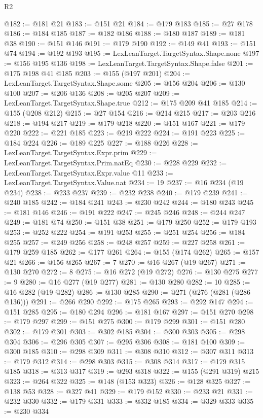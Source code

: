 \begin{lexlean}{R2}
\begin{coremodule}
@182 := @181 @21
@183 := @151 @21
@184 := @179 @183
@185 := @27 @178
@186 := @184 @185
@187 := @182 @186
@188 := @180 @187
@189 := @181 @38
@190 := @151 @146
@191 := @179 @190
@192 := @149 @41
@193 := @151 @74
@194 := @192 @193
@195 := LexLeanTarget.TargetSyntax.Shape.none
@197 := @156 @195 @136
@198 := LexLeanTarget.TargetSyntax.Shape.false
@201 := @175 @198 @41 @185
@203 := @155 (@197 @201)
@204 := LexLeanTarget.TargetSyntax.Shape.some
@205 := @156 @204
@206 := @130 @100
@207 := @206 @136
@208 := @205 @207
@209 := LexLeanTarget.TargetSyntax.Shape.true
@212 := @175 @209 @41 @185
@214 := @155 (@208 @212)
@215 := @27 @154
@216 := @214 @215
@217 := @203 @216
@218 := @194 @217
@219 := @179 @218
@220 := @151 @167
@221 := @179 @220
@222 := @221 @185
@223 := @219 @222
@224 := @191 @223
@225 := @184 @224
@226 := @189 @225
@227 := @188 @226
@228 := LexLeanTarget.TargetSyntax.Expr.prim
@229 := LexLeanTarget.TargetSyntax.Prim.natEq
@230 := @228 @229
@232 := LexLeanTarget.TargetSyntax.Expr.value @11
@233 := LexLeanTarget.TargetSyntax.Value.nat
@234 := 19
@237 := @16 @234 (@19 @234)
@238 := @233 @237
@239 := @232 @238
@240 := @179 @239
@241 := @240 @185
@242 := @184 @241
@243 := @230 @242
@244 := @180 @243
@245 := @181 @146
@246 := @191 @222
@247 := @245 @246
@248 := @244 @247
@249 := @181 @74
@250 := @151 @38
@251 := @179 @250
@252 := @179 @193
@253 := @252 @222
@254 := @191 @253
@255 := @251 @254
@256 := @184 @255
@257 := @249 @256
@258 := @248 @257
@259 := @227 @258
@261 := @179 @259 @185
@262 := @177 @261
@264 := @155 (@174 @262)
@265 := @157 @21
@266 := @156 @265
@267 := 7
@270 := @16 @267 (@19 @267)
@271 := @130 @270
@272 := 8
@275 := @16 @272 (@19 @272)
@276 := @130 @275
@277 := 9
@280 := @16 @277 (@19 @277)
@281 := @130 @280
@282 := 10
@285 := @16 @282 (@19 @282)
@286 := @130 @285
@290 := @271 (@276 (@281 (@286 @136)))
@291 := @266 @290
@292 := @175 @265
@293 := @292 @147
@294 := @151 @285
@295 := @180 @294
@296 := @181 @167
@297 := @151 @270
@298 := @179 @297
@299 := @151 @275
@300 := @179 @299
@301 := @151 @280
@302 := @179 @301
@303 := @302 @185
@304 := @300 @303
@305 := @298 @304
@306 := @296 @305
@307 := @295 @306
@308 := @181 @100
@309 := @300 @185
@310 := @298 @309
@311 := @308 @310
@312 := @307 @311
@313 := @179 @312
@314 := @298 @303
@315 := @308 @314
@317 := @179 @315 @185
@318 := @313 @317
@319 := @293 @318
@322 := @155 (@291 @319) @215
@323 := @264 @322
@325 := @148 (@153 @323)
@326 := @128 @325
@327 := @138 @53
@328 := @327 @41
@329 := @179 @152
@330 := @233 @21
@331 := @232 @330
@332 := @179 @331
@333 := @332 @185
@334 := @329 @333
@335 := @230 @334

\end{coremodule}
\end{lexlean}
